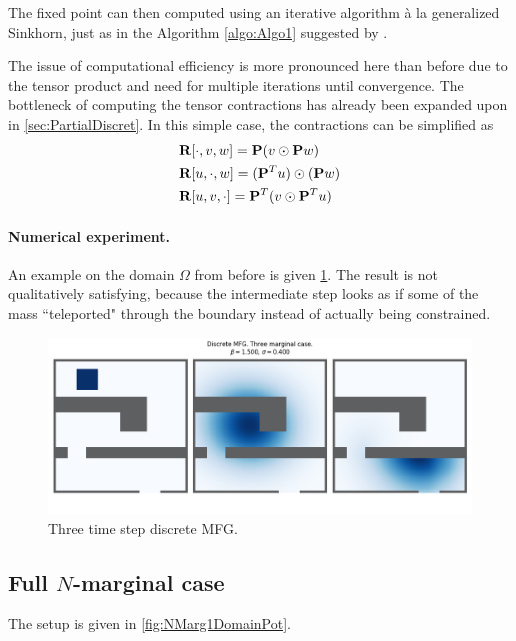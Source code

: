 \documentclass[../report.tex]{subfiles}
\begin{document}
The fixed point can then computed using an iterative algorithm à la generalized Sinkhorn, just as in the Algorithm \autoref{algo:Algo1} suggested by \cite{benamou2018entropy}.

The issue of computational efficiency is more pronounced here than before due to the tensor product and need for multiple iterations until convergence. The bottleneck of computing the tensor contractions has already been expanded upon in \cref{sec:PartialDiscret}. In this simple case, the contractions can be simplified as
\[
	\begin{aligned}
	&\mathbf{R}[\cdot,v,w] = 
	\mathbf{P} (v \odot \mathbf{P}w) \\
	&\mathbf{R}[u,\cdot,w]
	= (\mathbf{P}^Tu) \odot (\mathbf{P}w)  \\
	&\mathbf{R}[u, v, \cdot] = 
	\mathbf{P}^T (v \odot \mathbf{P}^T u)
	\end{aligned}
\]

\paragraph{Numerical experiment.} An example on the domain $\Omega$ from before is given \cref{fig:3MargTransport}. The result is not qualitatively satisfying, because the intermediate step looks as if some of the mass ``teleported" through the boundary instead of actually being constrained.

\begin{figure}
	\centering
	\includegraphics[width=.8\linewidth]{../project/images/three_marginal_room1.png}
	\caption{Three time step discrete MFG.}\label{fig:3MargTransport}
\end{figure}



\subsection{Full $N$-marginal case}

The setup is given in \cref{fig:NMarg1DomainPot}.
\end{document}
